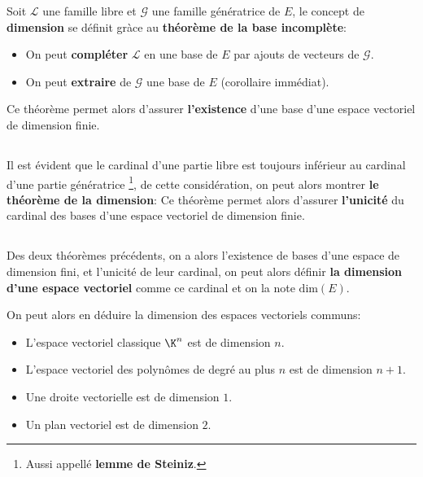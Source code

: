 Soit \(\mathcal{L}\) une famille libre et \(\mathcal{G}\) une famille génératrice de \(E\), le concept de \textbf{dimension} se définit gràce au \textbf{théorème de la base incomplète}:
\begin{itemize}
   \item On peut \textbf{compléter} \(\mathcal{L}\) en une base de \(E\) par ajouts de vecteurs de \(\mathcal{G}\).
   \item On peut \textbf{extraire} de \(\mathcal{G}\) une base de \(E\) (corollaire immédiat).
\end{itemize}
Ce théorème permet alors d'assurer \textbf{l'existence} d'une base d'une espace vectoriel de dimension finie.

\subsection*{}

Il est évident que le cardinal d'une partie libre est toujours inférieur au cardinal d'une partie génératrice \footnote[1]{Aussi appellé \textbf{lemme de Steiniz}.}, de cette considération, on peut alors montrer \textbf{le théorème de la dimension}:
Ce théorème permet alors d'assurer \textbf{l'unicité} du cardinal des bases d'une espace vectoriel de dimension finie.

\subsection*{}

Des deux théorèmes précédents, on a alors l'existence de bases d'une espace de dimension fini, et l'unicité de leur cardinal, on peut alors définir \textbf{la dimension d'une espace vectoriel} comme ce cardinal et on la note \(\text{dim}(E)\).\<

On peut alors en déduire la dimension des espaces vectoriels communs:
\begin{itemize}
   \item L'espace vectoriel classique \(\K^n\) est de dimension \(n\).
   \item L'espace vectoriel des polynômes de degré au plus \(n\) est de dimension \(n + 1\).
   \item Une droite vectorielle est de dimension \(1\).
   \item Un plan vectoriel est de dimension \(2\).
\end{itemize}

